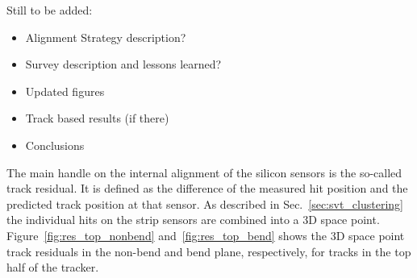 
{\color{red} Still to be added:
\begin{itemize}
\item {Alignment Strategy description?}
\item Survey description and lessons learned?
\item Updated figures
\item Track based results (if there)
\item Conclusions 
\end{itemize}
}

The main handle on the internal alignment of the silicon sensors is the so-called track residual. It is defined as the difference of the measured hit position and the predicted track 
position at that sensor. As described in Sec.~\ref{sec:svt_clustering} the individual hits on the 
strip sensors are combined into a 3D space point. Figure~\ref{fig:res_top_nonbend} and~\ref{fig:res_top_bend} shows the 3D space point track residuals in the non-bend and bend plane, respectively, for tracks in the top half of the tracker.
